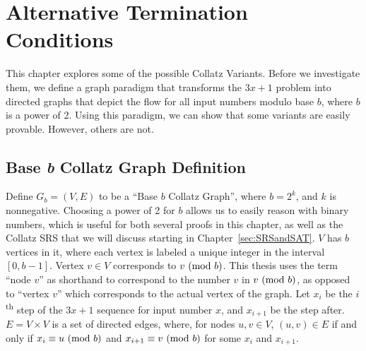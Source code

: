 \chapter{Alternative Termination Conditions} \label{sec:alttercdns}
 This chapter explores some of the possible Collatz Variants. Before we investigate them, we define a graph paradigm that transforms the $3x+1$ problem into directed graphs that depict the flow for all input numbers modulo base $b$, where $b$ is a power of 2. Using this paradigm, we can show that some variants are easily provable. However, others are not.
\section{Base \textit{b} Collatz Graph Definition} \label{subsec:colgraph}
Define $G_b=(V,E)$ to be a ``Base $b$ Collatz Graph'', where $b = 2^k$, and $k$ is nonnegative. Choosing a power of 2 for $b$ allows us to easily reason with binary numbers, which is useful for both several proofs in this chapter, as well as the Collatz SRS that we will discuss starting in Chapter~\ref{sec:SRSandSAT}. $V$ has $b$ vertices in it, where each vertex is labeled a unique integer in the interval $[0, b-1]$. Vertex $v \in V$ corresponds to $v \ (\mathrm{mod}\ b)$. This thesis uses the term ``node $v$'' as shorthand to correspond to the number $v$ in $v \ (\mathrm{mod}\ b)$, as opposed to ``vertex $v$'' which corresponds to the actual vertex of the graph. Let $x_i$ be the $i$\textsuperscript{th} step of the $3x+1$ sequence for input number $x$, and $x_{i+1}$ be the step after. $E = V \times V$ is a set of directed edges, where, for nodes $u, v \in V$, $(u,v) \in E$ if and only if $x_i \equiv u \ (\mathrm{mod}\ b)$ and $x_{i+1} \equiv v \ (\mathrm{mod}\ b)$ for some $x_i$ and $x_{i+1}$. \par

